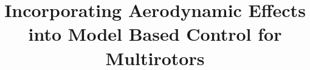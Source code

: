 \documentclass[10pt,twoside,a4paper]{report}
\begin{document}
\newcommand{\E}{\mathrm{E}}
\newcommand{\Var}{\mathrm{Var}}
\newcommand*\mean[1]{\overline{#1}}
\renewcommand{\d}[1]{\ensuremath{\operatorname{d}\!{#1}}}
\newcommand{\ddt}{\frac{\d{}}{\d{t}}}
\newcommand{\norm}[1]{\left\lVert#1\right\rVert}
\newcommand{\doublesize}[1]{\scalebox{2}{$#1$}}
\newcommand{\onehalfsize}[1]{\scalebox{1.5}{$#1$}}

\newcommand{\rotOW}{\mathbf{R}_{\mathcal{O}\mathcal{W}}}
\newcommand{\rotWO}{\mathbf{R}_{\mathcal{W}\mathcal{O}}}
\newcommand{\rotOB}{\mathbf{R}_{\mathcal{O}\mathcal{B}}}
\newcommand{\rotBO}{\mathbf{R}_{\mathcal{B}\mathcal{O}}}
\newcommand{\rotBW}{\mathbf{R}_{\mathcal{B}\mathcal{W}}}
\newcommand{\rotWB}{\mathbf{R}_{\mathcal{W}\mathcal{B}}}
\newcommand{\world}[1]{#1_{\mathcal{W}}}
\newcommand{\orientation}[1]{#1_\mathcal{O}}
\newcommand{\body}[1]{#1_\mathcal{B}}
\newcommand{\discrete}[1]{\bar{#1}} 


\newlength\figureheight 
\newlength\figurewidth
\setlength{} 
\setlength\figureheight{0.6\figurewidth} 


\title{Incorporating Aerodynamic Effects into Model Based Control
for Multirotors}



\projectYear{\the\year} %

\maketitle
\pagestyle{plain}

\pagestyle{empty}


\end{document}
